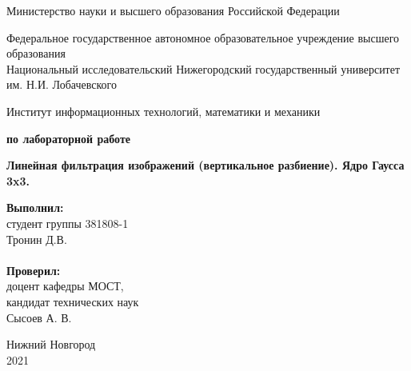 \documentclass{report}
\begin{document}
\begin{titlepage}

\begin{center}
Министерство науки и высшего образования Российской Федерации
\end{center}

\begin{center}
Федеральное государственное автономное образовательное учреждение высшего образования \\
Национальный исследовательский Нижегородский государственный университет им. Н.И. Лобачевского
\end{center}

\begin{center}
Институт информационных технологий, математики и механики
\end{center}

\vspace{4em}

\begin{center}
\textbf{ по лабораторной работе} \\
\end{center}
\begin{center}
\textbf{\Large Линейная фильтрация изображений (вертикальное разбиение). Ядро Гаусса 3x3.} \\
\end{center}

\vspace{4em}

\newbox{\lbox}
\newlength{\maxl}
\setlength{\maxl}{\wd\lbox}
\hfill\parbox{7cm}{
\hspace*{5cm}\hspace*{-5cm}\textbf{Выполнил:} \\ студент группы 381808-1 \\ Тронин Д.В.\\
\\
\hspace*{5cm}\hspace*{-5cm}\textbf{Проверил:}\\ доцент кафедры МОСТ, \\ кандидат технических наук \\ Сысоев А. В.}

\vspace{\fill}

\begin{center} Нижний Новгород \\ 2021 \end{center}

\end{titlepage}
\end{document}
